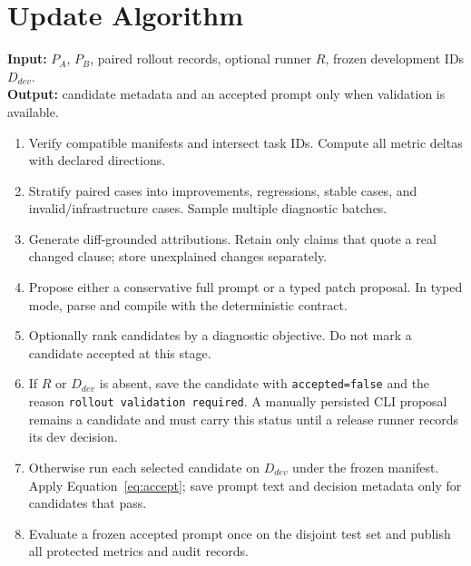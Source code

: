 \documentclass[10pt]{article}
\begin{document}
\section{Update Algorithm}
\noindent\textbf{Input:} $P_A$, $P_B$, paired rollout records, optional runner $R$, frozen development IDs $D_{dev}$.\\
\textbf{Output:} candidate metadata and an accepted prompt only when validation is available.\\
\begin{enumerate}
\item Verify compatible manifests and intersect task IDs. Compute all metric deltas with declared directions.
\item Stratify paired cases into improvements, regressions, stable cases, and invalid/infrastructure cases. Sample multiple diagnostic batches.
\item Generate diff-grounded attributions. Retain only claims that quote a real changed clause; store unexplained changes separately.
\item Propose either a conservative full prompt or a typed patch proposal. In typed mode, parse and compile with the deterministic contract.
\item Optionally rank candidates by a diagnostic objective. Do not mark a candidate accepted at this stage.
\item If $R$ or $D_{dev}$ is absent, save the candidate with \texttt{accepted=false} and the reason \texttt{rollout validation required}. A manually persisted CLI proposal remains a candidate and must carry this status until a release runner records its dev decision.
\item Otherwise run each selected candidate on $D_{dev}$ under the frozen manifest. Apply Equation~\ref{eq:accept}; save prompt text and decision metadata only for candidates that pass.
\item Evaluate a frozen accepted prompt once on the disjoint test set and publish all protected metrics and audit records.
\end{enumerate}
\end{document}
